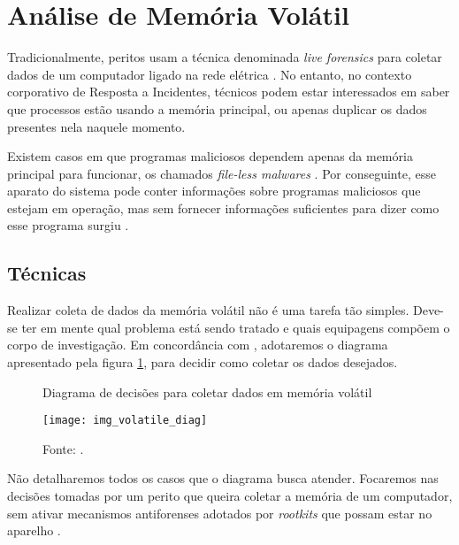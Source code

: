 \section{Análise de Memória Volátil}
    
    \vspace{10.5cm}
    
    \hspace{1cm}
    Tradicionalmente, peritos usam a técnica denominada \textit{live forensics} para coletar dados de um computador ligado na rede elétrica \cite{vecchia2019}. No entanto, no contexto corporativo de Resposta a Incidentes, técnicos podem estar interessados em saber que processos estão usando a memória principal, ou apenas duplicar os dados presentes nela naquele momento.
    
    \vspace{4mm}
    
    \hspace{1cm}
    Existem casos em que programas maliciosos dependem apenas da memória principal para funcionar, os chamados \textit{file-less malwares} \cite{wael2018}. Por conseguinte, esse aparato do sistema pode conter informações sobre programas maliciosos que estejam em operação, mas sem fornecer informações suficientes para dizer como esse programa surgiu \cite{luttgens2014}.

    \subsection{Técnicas}
    
    \hspace{1cm}
    Realizar coleta de dados da memória volátil não é uma tarefa tão simples. Deve-se ter em mente qual problema está sendo tratado e quais equipagens compõem o corpo de investigação. Em concordância com , adotaremos o diagrama apresentado pela figura \ref{diagrama_volatile}, para decidir como coletar os dados desejados.
    
    \begin{figure}[H]
    	\centering
    	\caption{Diagrama de decisões para coletar dados em memória volátil}
    	\texttt{[image: img\_volatile\_diag]}
    	\caption*{Fonte: .}
    	\label{diagrama_volatile}
    \end{figure}
    
    \hspace{1cm}
    Não detalharemos todos os casos que o diagrama busca atender. Focaremos nas decisões tomadas por um perito que queira coletar a memória de um computador, sem ativar mecanismos antiforenses adotados por \textit{rootkits} que possam estar no aparelho \cite{ligh2014}.
    
